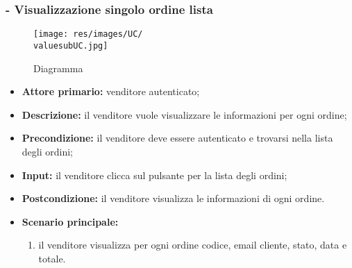 \subsubsection{ - Visualizzazione singolo ordine lista}
\begin{figure}[H]
    \centering
    \texttt{[image: res/images/UC/\\valuesubUC.jpg]}
    \caption{Diagramma }
\end{figure}
\begin{itemize}
    \item \textbf{Attore primario:} venditore autenticato;
    \item \textbf{Descrizione:} il venditore vuole visualizzare le informazioni per ogni ordine;
    \item \textbf{Precondizione:} il venditore deve essere autenticato e trovarsi nella lista degli ordini;
    \item \textbf{Input:} il venditore clicca sul pulsante per la lista degli ordini;
    \item \textbf{Postcondizione:} il venditore visualizza le informazioni di ogni ordine.
    \item \textbf{Scenario principale:}
        \begin{enumerate}
            \item il venditore visualizza per ogni ordine codice, email cliente, stato, data e totale.
        \end{enumerate}
\end{itemize}

\stepsubUserCase
